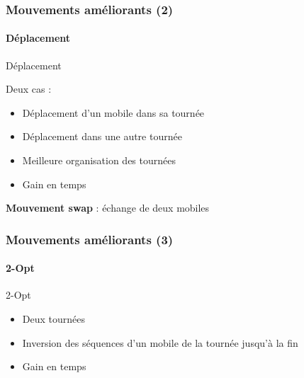 \begin{frame}
	\frametitle{Mouvements améliorants (2)}
	\framesubtitle{Déplacement}
	\begin{block}{Déplacement}
		\centering
		\begin{tikzpicture}[scale=.7,schema,transform shape,thick]
			
		\end{tikzpicture}
	\end{block}
	Deux cas :
	\begin{itemize}
		\item Déplacement d'un mobile dans sa tournée
		\item Déplacement dans une autre tournée
	\end{itemize}
	\vspace*{1em}
	\begin{itemize}
		\item Meilleure organisation des tournées
		\item Gain en temps
	\end{itemize}
	\vspace*{.5em}
	\textbf{Mouvement swap} : échange de deux mobiles
	
\end{frame}
\begin{frame}
	\frametitle{Mouvements améliorants (3)}
	\framesubtitle{2-Opt}
	\begin{block}{2-Opt}
		\centering
		\begin{tikzpicture}[scale=.7,schema,transform shape,thick]
			
		\end{tikzpicture}
	\end{block}
	\begin{itemize}
		\item Deux tournées
		\item Inversion des séquences d'un mobile de la tournée jusqu'à la fin
		\item Gain en temps
	\end{itemize}
\end{frame}
